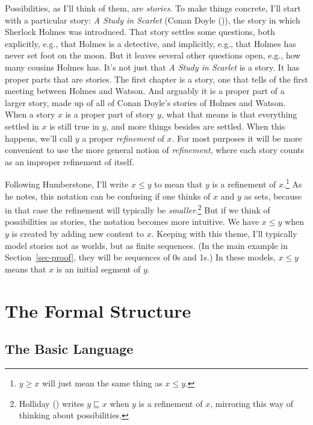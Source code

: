 \documentclass[
  11pt,
  letterpaper,
  DIV=11,
  numbers=noendperiod,
  twoside]{scrartcl}
\begin{document}
Possibilities, as I'll think of them, are \emph{stories}. To make things
concrete, I'll start with a particular story: \emph{A Study in Scarlet}
(Conan Doyle ()), the story in which
Sherlock Holmes was introduced. That story settles some questions, both
explicitly, e.g., that Holmes is a detective, and implicitly, e.g., that
Holmes has never set foot on the moon. But it leaves several other
questions open, e.g., how many cousins Holmes has. It's not just that
\emph{A Study in Scarlet} is a story. It has proper parts that are
stories. The first chapter is a story, one that tells of the first
meeting between Holmes and Watson. And arguably it is a proper part of a
larger story, made up of all of Conan Doyle's stories of Holmes and
Watson. When a story \(x\) is a proper part of story \(y\), what that
means is that everything settled in \(x\) is still true in \(y\), and
more things besides are settled. When this happens, we'll call \(y\) a
proper \emph{refinement} of \(x\). For most purposes it will be more
convenient to use the more general notion of \emph{refinement}, where
each story counts as an improper refinement of itself.

Following Humberstone, I'll write \(x \leqslant y\) to mean that \(y\)
is a refinement of \(x\).\footnote{\(y \geqslant x\) will just mean the
  same thing as \(x \leqslant y\).} As he notes, this notation can be
confusing if one thinks of \(x\) and \(y\) as sets, because in that case
the refinement will typically be \emph{smaller}.\footnote{Holliday
  () writes \(y \sqsubseteq x\) when
  \(y\) is a refinement of \(x\), mirroring this way of thinking about
  possibilities.} But if we think of possibilities as stories, the
notation becomes more intuitive. We have \(x \leqslant y\) when \(y\) is
created by adding new content to \(x\). Keeping with this theme, I'll
typically model stories not as worlds, but as finite sequences. (In the
main example in Section~\ref{sec-proof}, they will be sequences of 0s
and 1s.) In these models, \(x \leqslant y\) means that \(x\) is an
initial segment of \(y\).

\section{The Formal Structure}\label{sec-formal}

\subsection*{The Basic Language}\label{the-basic-language}
\end{document}
